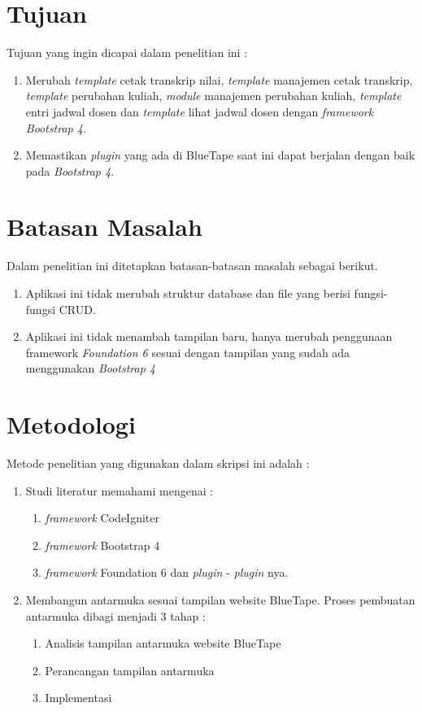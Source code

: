 \section{Tujuan}
\label{sec:tujuan}
Tujuan yang ingin dicapai dalam penelitian ini :

	\begin{enumerate}	
	\item Merubah \textit{template} cetak transkrip nilai, \textit{template} manajemen cetak transkrip, \textit{template} perubahan kuliah, \textit{module} manajemen perubahan kuliah, \textit{template} entri jadwal dosen dan \textit{template} lihat jadwal dosen dengan \textit{framework Bootstrap 4}.
	\item Memastikan \textit{plugin} yang ada di BlueTape saat ini dapat berjalan dengan baik pada \textit{Bootstrap 4}.
	\end{enumerate}

\section{Batasan Masalah}
\label{sec:batasan}
Dalam penelitian ini ditetapkan batasan-batasan masalah sebagai berikut.
\begin{enumerate}	
	\item Aplikasi ini tidak merubah struktur database dan file yang berisi fungsi-fungsi CRUD.
	\item Aplikasi ini tidak menambah tampilan baru, hanya merubah penggunaan framework \textit{ Foundation 6} sesuai dengan tampilan yang sudah ada menggunakan \textit{Bootstrap 4}
	\end{enumerate}		


\section{Metodologi}
\label{sec:metlit}
Metode penelitian yang digunakan dalam skripsi ini adalah :
\begin{enumerate}
	\item Studi literatur memahami mengenai :
	\begin{enumerate}
		\item \textit{framework} CodeIgniter
		\item \textit{framework} Bootstrap 4
		\item \textit{framework} Foundation 6 dan \textit{plugin} - \textit{plugin} nya.
	\end{enumerate}
	\item  Membangun antarmuka sesuai tampilan website BlueTape. Proses pembuatan antarmuka dibagi menjadi 3 tahap :
	\begin{enumerate}
		\item Analisis tampilan antarmuka website BlueTape
		\item Perancangan tampilan antarmuka
		\item Implementasi		
	\end{enumerate}
\end{enumerate}


